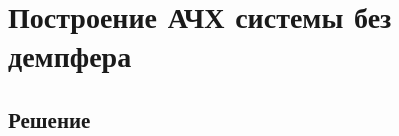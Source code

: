 \documentclass[a4paper,14pt]{extarticle}
\begin{document}
    \hypertarget{ux43fux43eux441ux442ux440ux43eux435ux43dux438ux435-ux430ux447ux445-ux441ux438ux441ux442ux435ux43cux44b-ux431ux435ux437-ux434ux435ux43cux43fux444ux435ux440ux430}{%
\section{Построение АЧХ системы без
демпфера}\label{ux43fux43eux441ux442ux440ux43eux435ux43dux438ux435-ux430ux447ux445-ux441ux438ux441ux442ux435ux43cux44b-ux431ux435ux437-ux434ux435ux43cux43fux444ux435ux440ux430}}

    \hypertarget{ux440ux435ux448ux435ux43dux438ux435}{%
\subsection{Решение}\label{ux440ux435ux448ux435ux43dux438ux435}}
\end{document}

